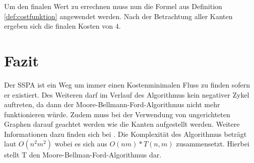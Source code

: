 Um den finalen Wert zu errechnen muss nun die Formel aus Definition \ref{def:costfunktion} angewendet werden. Nach der Betrachtung aller Kanten ergeben sich die finalen Kosten von $4$.

\section{Fazit}
Der SSPA ist ein Weg um immer einen Kostenminimalen Fluss zu finden sofern er existiert. Des Weiteren darf im Verlauf des Algorithmus kein negativer Zykel auftreten, da dann der Moore-Bellmann-Ford-Algorithmus nicht mehr funktionieren würde. Zudem muss bei der Verwendung von ungerichteten Graphen darauf geachtet werden wie die Kanten aufgestellt werden. Weitere Informationen dazu finden sich bei \cite{sspa}. Die Komplexität des Algorithmus beträgt laut \cite{sspa} $O(n^2m^2)$ wobei es sich aus $O(nm) * T(n,m)$ zusammensetzt. Hierbei stellt T den Moore-Bellman-Ford-Algorithmus dar.